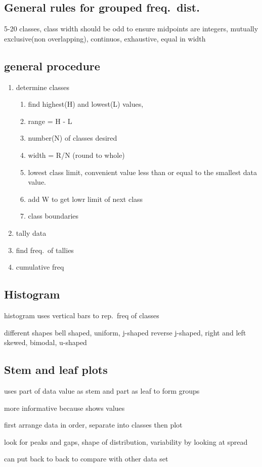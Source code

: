 \documentclass[11pt]{amsart}
\begin{document}
\subsection{General rules for grouped freq.\ dist.}
\par 5-20 classes, class width should be odd to ensure midpoints are
integers, mutually exclusive(non overlapping), continuos, exhaustive,
equal in width
\subsection{general procedure}
\begin{enumerate}
  \item determine classes
    \begin{enumerate}
      \item find highest(H) and lowest(L) values,
      \item range = H - L
      \item number(N) of classes desired
      \item width =  R/N (round to whole)
      \item lowest class limit, convenient value less than or equal to the
        smallest data value.
      \item add W to get lowr limit of next class
      \item class boundaries
    \end{enumerate}
  \item tally data
  \item find freq.\ of tallies
  \item cumulative freq
\end{enumerate}
\subsection{Histogram}
\par histogram uses vertical bars to rep.\ freq of classes
\par different shapes bell shaped, uniform, j-shaped
reverse j-shaped, right and left skewed, bimodal, u-shaped
\subsection{Stem and leaf plots}
\par uses part of data value as stem and part as leaf to form groups
\par more informative because shows values
\par first arrange data in order, separate into classes then plot
\par look for peaks and gaps, shape of distribution, variability by looking
at spread
\par can put back to back to compare with other data set
\end{document}
